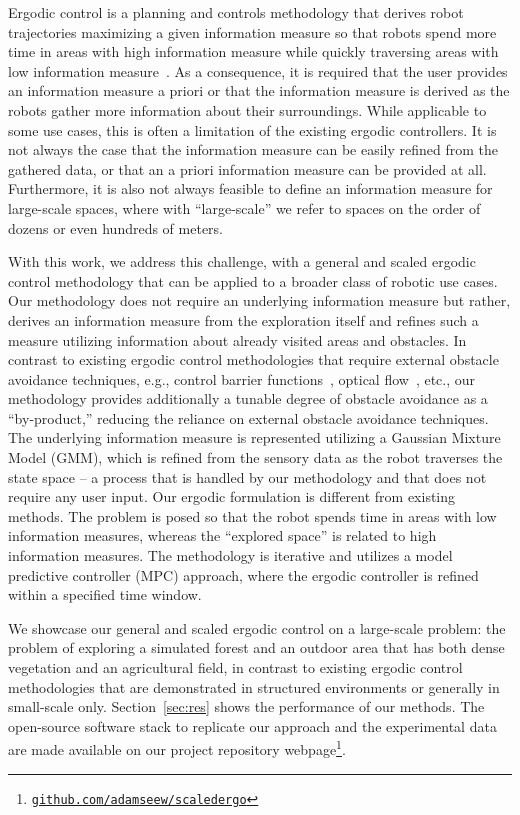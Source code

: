 \documentclass[letterpaper,10pt,conference,twoside]{IEEEtran}
\theoremstyle{definition}
\begin{document}
Ergodic control is a planning and controls methodology that derives robot trajectories maximizing a given information measure so that robots spend more time in areas with high information measure while quickly traversing areas with low information measure~\cite{mathew2011metrics,abraham2017ergodic,miller2013trajectory}. As a consequence, it is required that the user provides an information measure a priori or that the information measure is derived as the robots gather more information about their surroundings. While applicable to some use cases, this is often a limitation of the existing ergodic controllers. It is not always the case that the information measure can be easily refined from the gathered data, or that an a priori information measure can be provided at all. Furthermore, it is also not always feasible to define an information measure for large-scale spaces, %
where with ``large-scale'' we refer to spaces on the order of dozens or even hundreds of meters. 

With this work, we address this challenge, with a general and scaled ergodic control methodology that can be applied to a broader class of robotic use cases. Our methodology does not require an underlying information measure but rather, derives an information measure from the exploration itself and refines such a measure utilizing information about already visited areas and obstacles. %
In contrast to existing ergodic control methodologies that require external obstacle avoidance techniques, e.g., control barrier functions~\cite{lerch2023safety}, optical flow~\cite{prabhakar2020ergodic}, etc., our methodology provides additionally a tunable degree of obstacle avoidance as a ``by-product,'' reducing the reliance on external obstacle avoidance techniques.  
%
The underlying information measure is represented utilizing a Gaussian Mixture Model (GMM), which is refined from the sensory data as the robot traverses the state space -- a process that is handled by our methodology and that does not require any user input. Our ergodic formulation is different from existing methods. The problem is posed so that the robot spends time in areas with low information measures, whereas the ``explored space'' is related to high information measures. The methodology is iterative and utilizes a model predictive controller (MPC) approach, where the ergodic controller is refined within a specified time window.

\IEEEpubidadjcol
We showcase our general and scaled ergodic control on a large-scale problem: the problem of exploring a simulated forest and an outdoor area that has both dense vegetation and an agricultural field, in contrast to existing ergodic control methodologies that are demonstrated in structured environments or generally in small-scale only. Section~\ref{sec:res} shows the performance of our methods. The open-source software stack to replicate our approach and the experimental data are made available on our project repository webpage\footnote{\href{https://github.com/adamseew/scaledergo}{\tt github.com/adamseew/scaledergo}}.
\end{document}
